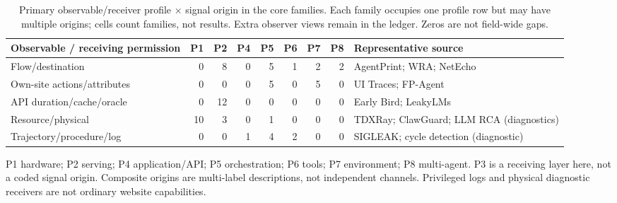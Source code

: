 \begin{table}[t]\centering\footnotesize
\caption{Primary observable/receiver profile $\times$ signal origin in the \FinalCore{} core families. Each family occupies one profile row but may have multiple origins; cells count families, not results. Extra observer views remain in the ledger. Zeros are not field-wide gaps.}\label{tab:origin-receiver-map}
\begin{tabularx}{\textwidth}{@{}YrrrrrrrY@{}}\toprule
Observable / receiving permission & P1 & P2 & P4 & P5 & P6 & P7 & P8 & Representative source\\\midrule
Flow/destination & 0 & 8 & 0 & 5 & 1 & 2 & 2 & AgentPrint; WRA; NetEcho \\
Own-site actions/attributes & 0 & 0 & 0 & 5 & 0 & 5 & 0 & UI Traces; FP-Agent \\
API duration/cache/oracle & 0 & 12 & 0 & 0 & 0 & 0 & 0 & Early Bird; LeakyLMs \\
Resource/physical & 10 & 3 & 0 & 1 & 0 & 0 & 0 & TDXRay; ClawGuard; LLM RCA (diagnostics) \\
Trajectory/procedure/log & 0 & 0 & 1 & 4 & 2 & 0 & 0 & SIGLEAK; cycle detection (diagnostic) \\
\bottomrule\end{tabularx}
\par\smallskip\raggedright\footnotesize P1 hardware; P2 serving; P4 application/API; P5 orchestration; P6 tools; P7 environment; P8 multi-agent. P3 is a receiving layer here, not a coded signal origin. Composite origins are multi-label descriptions, not independent channels. Privileged logs and physical diagnostic receivers are not ordinary website capabilities.
\end{table}
